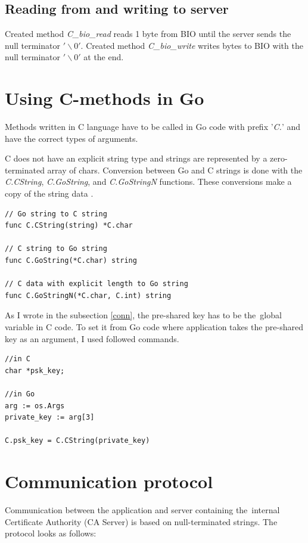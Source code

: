 \documentclass[
  twoside, 12pt, 
  printed, %
  notable,   %
  lof,     %
  lot,     %
]{fithesis3}
\begin{document}
\subsection{Reading from and writing to server}
Created method \textit{C\_bio\_read} reads 1 byte from BIO until the server sends the null 
terminator $'\backslash0'$. Created method \textit{C\_bio\_write} writes bytes to BIO with the 
null terminator $'\backslash0'$ at the end.

\section{Using C-methods in Go}\label{c-method}
Methods written in C language have to be called in Go code with prefix '\textit{C.}' and have the 
correct types of arguments. 

C does not have an explicit string type and strings are represented by 
a zero-terminated array of chars. Conversion between Go and C strings is done with the 
\textit{C.CString}, \textit{C.GoString}, and \textit{C.GoStringN} functions. These conversions 
make a copy of the string data \cite{bloggolangorg}. 

\begin{lstlisting}
// Go string to C string
func C.CString(string) *C.char

// C string to Go string
func C.GoString(*C.char) string

// C data with explicit length to Go string
func C.GoStringN(*C.char, C.int) string
\end{lstlisting}

As I wrote in the subsection \ref{conn}, the pre-shared key has to be the~global variable in C 
code. To set it from Go code where application takes the pre-shared key as an argument, I used 
followed commands.
\begin{lstlisting}
//in C
char *psk_key;

//in Go
arg := os.Args
private_key := arg[3]

C.psk_key = C.CString(private_key)
\end{lstlisting}

\section{Communication protocol}\label{comprot}
Communication between the application and server containing the~internal Certificate Authority (CA Server) is based on null-terminated strings. The protocol looks as follows:
\end{document}
